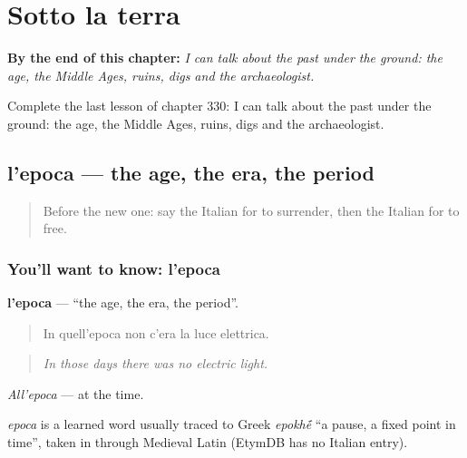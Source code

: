
\chapter{Sotto la terra}
\label{ch:it-sotto-la-terra}

\begin{chapteropening}
\textbf{By the end of this chapter:} \emph{I can talk about the past under the ground: the age, the Middle Ages, ruins, digs and the archaeologist.}

Complete the last lesson of chapter 330: I can talk about the past under the ground: the age, the Middle Ages, ruins, digs and the archaeologist.
\end{chapteropening}

\section[l'epoca]{l'epoca — the age, the era, the period}

\label{lesson:IT-C330-epoca}



\begin{quote}
Before the new one: say the Italian for to surrender, then the Italian for to free.
\end{quote}

\subsection*{You'll want to know: l'epoca}
\textbf{l'epoca} — \textquotedblleft{}the age, the era, the period\textquotedblright{}.

\begin{quote}
In quell'epoca non c'era la luce elettrica.
\end{quote}

\begin{quote}
\emph{In those days there was no electric light.}
\end{quote}

\emph{All'epoca} — at the time.

\begin{cousinweb}
\emph{epoca} is a learned word usually traced to Greek \emph{epokh\'{\={e}}} \textquotedblleft{}a pause, a fixed point in time\textquotedblright{}, taken in through Medieval Latin (EtymDB has no Italian entry).
\end{cousinweb}

